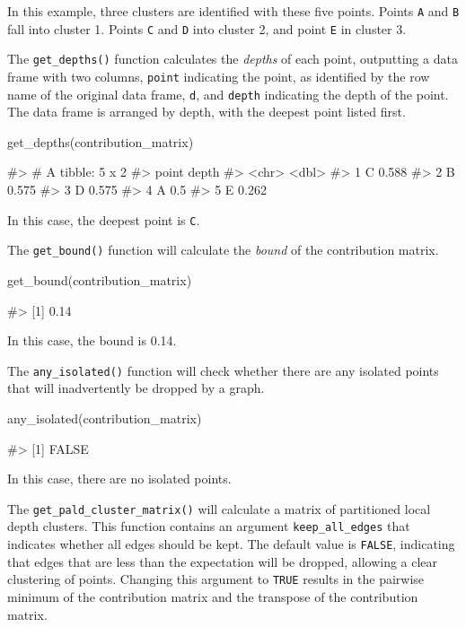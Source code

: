 In this example, three clusters are identified with these five points.
Points \texttt{A} and \texttt{B} fall into cluster 1. Points \texttt{C}
and \texttt{D} into cluster 2, and point \texttt{E} in cluster 3.

The \texttt{get\_depths()} function calculates the \emph{depths} of each
point, outputting a data frame with two columns, \texttt{point}
indicating the point, as identified by the row name of the original data
frame, \texttt{d}, and \texttt{depth} indicating the depth of the point.
The data frame is arranged by depth, with the deepest point listed
first.

\begin{Schunk}
\begin{Sinput}
get_depths(contribution_matrix)
\end{Sinput}
\begin{Soutput}
#> # A tibble: 5 x 2
#>   point depth
#>   <chr> <dbl>
#> 1 C     0.588
#> 2 B     0.575
#> 3 D     0.575
#> 4 A     0.5  
#> 5 E     0.262
\end{Soutput}
\end{Schunk}

In this case, the deepest point is \texttt{C}.

The \texttt{get\_bound()} function will calculate the \emph{bound} of
the contribution matrix.

\begin{Schunk}
\begin{Sinput}
get_bound(contribution_matrix)
\end{Sinput}
\begin{Soutput}
#> [1] 0.14
\end{Soutput}
\end{Schunk}

In this case, the bound is 0.14.

The \texttt{any\_isolated()} function will check whether there are any
isolated points that will inadvertently be dropped by a graph.

\begin{Schunk}
\begin{Sinput}
any_isolated(contribution_matrix)
\end{Sinput}
\begin{Soutput}
#> [1] FALSE
\end{Soutput}
\end{Schunk}

In this case, there are no isolated points.

The \texttt{get\_pald\_cluster\_matrix()} will calculate a matrix of
partitioned local depth clusters. This function contains an argument
\texttt{keep\_all\_edges} that indicates whether all edges should be
kept. The default value is \texttt{FALSE}, indicating that edges that
are less than the expectation will be dropped, allowing a clear
clustering of points. Changing this argument to \texttt{TRUE} results in
the pairwise minimum of the contribution matrix and the transpose of the
contribution matrix.

